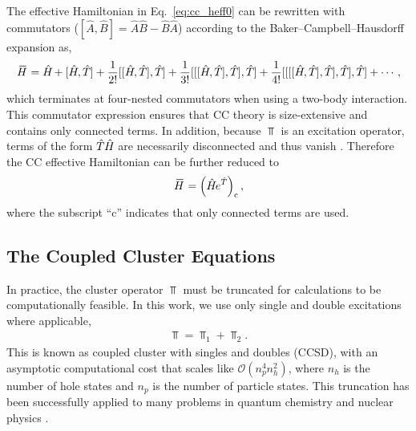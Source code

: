 \documentclass[thesis.tex]{subfiles}
\begin{document}
The effective Hamiltonian in Eq.\ \eqref{eq:cc_heff0} can be rewritten with commutators ($[ \hat{A},\hat{B} ] = \hat{A}\hat{B} - \hat{B}\hat{A}$) according to the Baker--Campbell--Hausdorff expansion as,
\begin{align*}
  \EHam = \Ham + [\Ham, \Top] + \frac{1}{2!} [[\Ham, \Top], \Top] + \frac{1}{3!} [[[\Ham, \Top], \Top], \Top] + \frac{1}{4!} [[[[\Ham, \Top], \Top], \Top], \Top] + \cdots,
\end{align*}
which terminates at four-nested commutators when using a two-body  interaction.  This commutator expression ensures that CC theory is size-extensive and contains only connected terms.  In addition, because $\Top$ is an excitation operator, terms of the form $\hat{T}\hspace{-0.25pt}\hat{H}\hspace{-1pt}$ are necessarily disconnected and thus vanish \cite{SHAVITT2009}.  Therefore the CC effective Hamiltonian can be further reduced to
\begin{align} \label{eq:cc_heff1}
  \EHam = \left(\Ham e^{\Top}\right)_{\mathrm{c}},
\end{align}
where the subscript ``$\mathrm{c}$'' indicates that only connected terms are used.

\subsection{The Coupled Cluster Equations} \label{section:intro_cc_equations}

In practice, the cluster operator $\Top$ must be truncated for calculations to be computationally feasible.  In this work, we use only single and double excitations where applicable,
\begin{align*}
  \Top = \Top_{1} + \Top_{2}.
\end{align*}
This is known as coupled cluster with singles and doubles (CCSD), with an asymptotic computational cost that scales like $\mathcal{O}\left( n_{p}^{4}n_{h}^{2} \right)$, where $n_{h}$ is the number of hole states and $n_{p}$ is the number of particle states.  This truncation has been successfully applied to many problems in quantum chemistry \cite{BARTLETT2007291} and nuclear physics \cite{KOWALSKI2004132501,HAGEN2014096302}.
\end{document}
